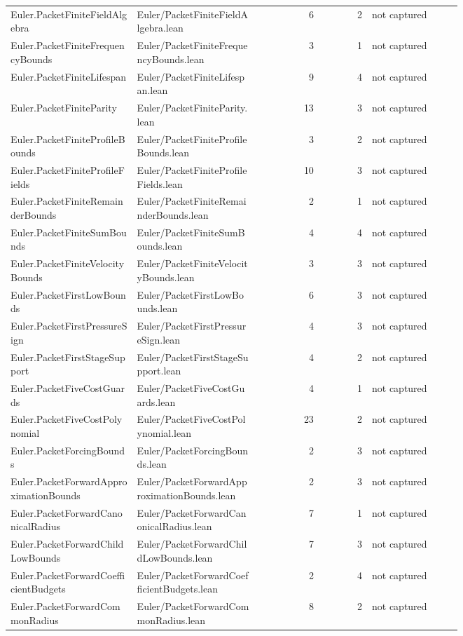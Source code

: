 \documentclass[10pt]{article}
\begin{document}
\begin{longtable}{p{0.28\linewidth}p{0.27\linewidth}r r p{0.20\linewidth}}
Euler.PacketFiniteFieldAlgebra & Euler/PacketFiniteFieldAlgebra.lean & 6 & 2 & not captured\\
Euler.PacketFiniteFrequencyBounds & Euler/PacketFiniteFrequencyBounds.lean & 3 & 1 & not captured\\
Euler.PacketFiniteLifespan & Euler/PacketFiniteLifespan.lean & 9 & 4 & not captured\\
Euler.PacketFiniteParity & Euler/PacketFiniteParity.lean & 13 & 3 & not captured\\
Euler.PacketFiniteProfileBounds & Euler/PacketFiniteProfileBounds.lean & 3 & 2 & not captured\\
Euler.PacketFiniteProfileFields & Euler/PacketFiniteProfileFields.lean & 10 & 3 & not captured\\
Euler.PacketFiniteRemainderBounds & Euler/PacketFiniteRemainderBounds.lean & 2 & 1 & not captured\\
Euler.PacketFiniteSumBounds & Euler/PacketFiniteSumBounds.lean & 4 & 4 & not captured\\
Euler.PacketFiniteVelocityBounds & Euler/PacketFiniteVelocityBounds.lean & 3 & 3 & not captured\\
Euler.PacketFirstLowBounds & Euler/PacketFirstLowBounds.lean & 6 & 3 & not captured\\
Euler.PacketFirstPressureSign & Euler/PacketFirstPressureSign.lean & 4 & 3 & not captured\\
Euler.PacketFirstStageSupport & Euler/PacketFirstStageSupport.lean & 4 & 2 & not captured\\
Euler.PacketFiveCostGuards & Euler/PacketFiveCostGuards.lean & 4 & 1 & not captured\\
Euler.PacketFiveCostPolynomial & Euler/PacketFiveCostPolynomial.lean & 23 & 2 & not captured\\
Euler.PacketForcingBounds & Euler/PacketForcingBounds.lean & 2 & 3 & not captured\\
Euler.PacketForwardApproximationBounds & Euler/PacketForwardApproximationBounds.lean & 2 & 3 & not captured\\
Euler.PacketForwardCanonicalRadius & Euler/PacketForwardCanonicalRadius.lean & 7 & 1 & not captured\\
Euler.PacketForwardChildLowBounds & Euler/PacketForwardChildLowBounds.lean & 7 & 3 & not captured\\
Euler.PacketForwardCoefficientBudgets & Euler/PacketForwardCoefficientBudgets.lean & 2 & 4 & not captured\\
Euler.PacketForwardCommonRadius & Euler/PacketForwardCommonRadius.lean & 8 & 2 & not captured\\

\end{longtable}
\end{document}

